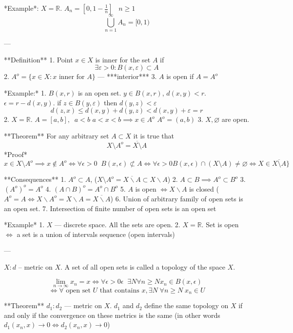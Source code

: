 *Example*:
$X = \mathbb{R}$. $A_{n} = [0, 1 - \frac{1}{n}]\;\;\; n \geq 1$
$$
\bigcup_{n=1}^{\infty} A_{n} = [0, 1)
$$

---

**Definition**
1. Point $x \in X$ is inner for the set $A$ if $$
\exists \varepsilon > 0: B(x, \varepsilon) \subset A
$$
2. $A^{o} = \{ x \in X: x \text{ inner for } A \}$ — ***interior***
3. $A$ is open if $A = A^{o}$


*Example:*
1. $B(x,r)$ is an open set.
$y \in B(x,r)$, $d(x,y) < r$. $\epsilon = r - d(x,y)$.
if $z \in B(y,\varepsilon)$ then $d(y,z) < \varepsilon$
$$
d(z,x) \leq d(x,y) + d(y,z) < d(x,y) + \varepsilon = r
$$
2. $X = \mathbb{R}$. $A = [a,b], \;\; a < b$
$a < x < b \implies x \in A^{o}$
$A^{o} = (a,b)$
3. $X, \varnothing$ are open.


**Theorem**
For any arbitrary set $A \subset X$ it is true that $$
X \setminus A^{o} = \overline{X \setminus} A
$$
*Proof*
$$
x \in X \setminus A^{o} \implies x \not\in A^{o} \iff \forall \epsilon > 0
\;\;
B(x,\epsilon) \not\subset A \iff \forall\epsilon > 0 B(x,\epsilon) \cap (X \setminus A) \neq \varnothing \iff X \in \overline{X \setminus A} \}
$$

**Consequences**
1. $A^{o} \subset A$, ($X \setminus A^{o} = \overline{X\backslash A} \subset X \backslash A$)
2. $A \subset B \implies A^{o} \subset B^{o}$
3. $(A^{o})^{o} = A^{o}$
4. $(A \cap B)^{o} = A^{o} \cap B^{o}$
5. $A$ is open $\iff X \backslash A$ is closed ($A^{o} = A \iff X \backslash A^{o} = X \backslash A = \overline{X\backslash A}$)
6. Union of arbitrary family of open sets is an open set.
7. Intersection of finite number of open sets is an open set

*Example*
1. $X$ — discrete space. All the sets are open.
2. $X = \mathbb{R}$. Set is open $\iff$ a set is a union of intervals sequence (open intervals)

---

$X: d$ – metric on $X$. A set of all open sets is called a topology of the space $X$.

$$
\lim_{ n \to \infty } x_{n} = x \iff
\forall \epsilon > 0 \epsilon \;\; \exists N \forall n \geq N x_{n} \in B (x,\epsilon)
$$
$$
\iff \forall \text{ open set } U \text{ that contains } x, \exists N \; \forall n \geq N \; x_{n} \in U
$$

**Theorem**
$d_{1}: d_{2}$ — metric on $X$. $d_{1}$ and $d_{2}$ define the same topology on $X$ if and only if the convergence on these metrics is the same (in other words $d_{1}(x_{n}, x) \to 0 \iff d_{2}(x_{n},x) \to 0$)

